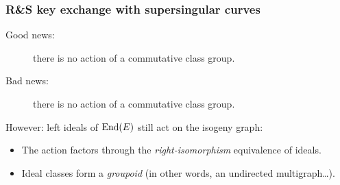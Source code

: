 \documentclass{beamer}
\begin{document}

\begin{frame}
  \frametitle{R\&S key exchange with supersingular curves}
  
  \begin{description}
  \item[Good news:] there is no action of a commutative class group.
  \item[Bad news:] there is no action of a commutative class group.
  \end{description}

  \alert{However:} left ideals of \emph{$\operatorname{End}(E)$} still act on the isogeny graph:

  \begin{center}
  \end{center}

  \begin{itemize}
  \item The action factors through the \emph{right-isomorphism}
    equivalence of ideals.
  \item Ideal classes form a \emph{groupoid} (in other words, an
    undirected multigraph\dots).
  \end{itemize}
\end{frame}

\end{document}
